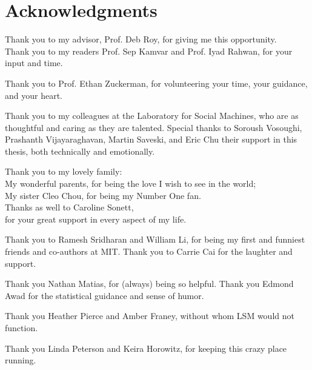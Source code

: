  
\section*{Acknowledgments}
 
 

Thank you to my advisor, Prof. Deb Roy, for giving me this opportunity.\\
Thank you to my readers Prof. Sep Kamvar and Prof. Iyad Rahwan, for your input and time.

Thank you to Prof. Ethan Zuckerman, for volunteering your time, your guidance, and your heart. 

Thank you to my colleagues at the Laboratory for Social Machines, who are as thoughtful and caring as they are talented. Special thanks to Soroush Vosoughi, Prashanth Vijayaraghavan, Martin Saveski, and Eric Chu their support in this thesis, both technically and emotionally.

Thank you to my lovely family: \\
My wonderful parents, for being the love I wish to see in the world;  \\
My sister Cleo Chou, for being my Number One fan.  \\
Thanks as well to Caroline Sonett, \\ 
for your great support in every aspect of my life.
  
Thank you to Ramesh Sridharan and William Li, for being my first and funniest friends and co-authors at MIT. Thank you to Carrie Cai for the laughter and support.

Thank you Nathan Matias, for (always) being so helpful. Thank you Edmond Awad for the statistical guidance and sense of humor. 

Thank you Heather Pierce and Amber Franey, without whom LSM would not function.  

Thank you Linda Peterson and Keira Horowitz, for keeping this crazy place running.



